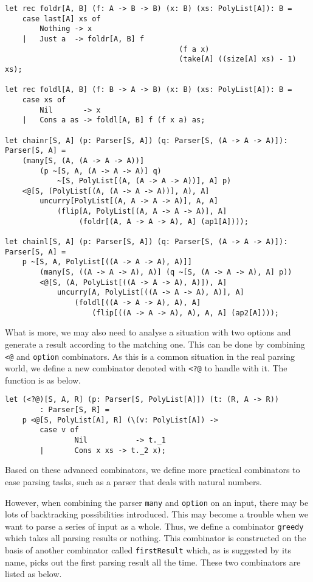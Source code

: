 \begin{lstlisting}
let rec foldr[A, B] (f: A -> B -> B) (x: B) (xs: PolyList[A]): B =
    case last[A] xs of
        Nothing -> x
    |   Just a  -> foldr[A, B] f
                                        (f a x)
                                        (take[A] ((size[A] xs) - 1) xs);

let rec foldl[A, B] (f: B -> A -> B) (x: B) (xs: PolyList[A]): B =
    case xs of
        Nil       -> x
    |   Cons a as -> foldl[A, B] f (f x a) as;

let chainr[S, A] (p: Parser[S, A]) (q: Parser[S, (A -> A -> A)]):
Parser[S, A] =
    (many[S, (A, (A -> A -> A))]
        (p ~[S, A, (A -> A -> A)] q)
            ~[S, PolyList[(A, (A -> A -> A))], A] p)
    <@[S, (PolyList[(A, (A -> A -> A))], A), A]
        uncurry[PolyList[(A, A -> A -> A)], A, A]
            (flip[A, PolyList[(A, A -> A -> A)], A]
                 (foldr[(A, A -> A -> A), A] (ap1[A])));

let chainl[S, A] (p: Parser[S, A]) (q: Parser[S, (A -> A -> A)]):
Parser[S, A] =
    p ~[S, A, PolyList[((A -> A -> A), A)]]
        (many[S, ((A -> A -> A), A)] (q ~[S, (A -> A -> A), A] p))
        <@[S, (A, PolyList[((A -> A -> A), A)]), A]
            uncurry[A, PolyList[((A -> A -> A), A)], A]
                (foldl[((A -> A -> A), A), A]
                    (flip[((A -> A -> A), A), A, A] (ap2[A])));
\end{lstlisting}

What is more, we may also need to analyse a situation with two options and generate a result according to the matching one. This can be done by combining \texttt{<@} and \texttt{option} combinators. As this is a common situation in the real parsing world, we define a new combinator denoted with \texttt{<?@} to handle with it. The function is as below.

\begin{lstlisting}
let (<?@)[S, A, R] (p: Parser[S, PolyList[A]]) (t: (R, A -> R))
        : Parser[S, R] =
    p <@[S, PolyList[A], R] (\(v: PolyList[A]) ->
        case v of
                Nil           -> t._1
        |       Cons x xs -> t._2 x);
\end{lstlisting}

Based on these advanced combinators, we define more practical combinators to ease parsing tasks, such as a parser that deals with natural numbers.

However, when combining the parser \texttt{many} and \texttt{option} on an input, there may be lots of backtracking possibilities introduced. This may become a trouble when we want to parse a series of input as a whole. Thus, we define a combinator \texttt{greedy} which takes all parsing results or nothing. This combinator is constructed on the basis of another combinator called \texttt{firstResult} which, as is suggested by its name, picks out the first parsing result all the time. These two combinators are listed as below.


